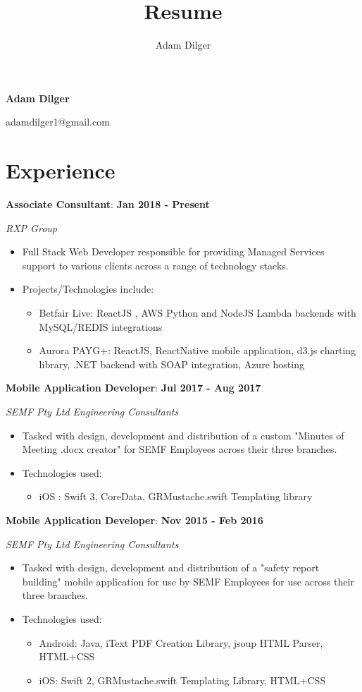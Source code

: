 \documentclass{article}
\author{Adam Dilger}
\title{Resume}
\makeatletter
\newcommand{\worktitle}[4]{
  \setlength{\parindent}{0pt}
  \small
  \textbf{#3}:
  \hfill
  \textbf{#1 - #2}

  \textit{#4}
}
\renewcommand{\maketitle}{
  \begin{center}
  \huge\textbf{Adam Dilger}
  \vspace{1mm}


  \normalsize
  adamdilger1@gmail.com
  \textbar
  \space
  0487349370
  \end{center}
}
\makeatother
\begin{document}
\maketitle

\section{Experience}

\worktitle
{Jan 2018}{Present}
{Associate Consultant}
{RXP Group}
\begin{itemize}
  \item Full Stack Web Developer responsible for providing Managed Services support to various clients across a range of technology stacks.
  \item Projects/Technologies include:
  \begin{itemize}
    \item Betfair Live: ReactJS , AWS Python and NodeJS Lambda backends with MySQL/REDIS integrations
    \item Aurora PAYG+: ReactJS, ReactNative mobile application, d3.js charting library, .NET backend with SOAP integration, Azure hosting
  \end{itemize}
\end{itemize}

\vspace{4mm}

\worktitle
{Jul 2017}{Aug 2017}
{Mobile Application Developer}
{SEMF Pty Ltd Engineering Consultants}
\begin{itemize}
  \item Tasked with design, development and distribution of a custom "Minutes of Meeting .docx creator" for SEMF Employees across their three branches.
  \item Technologies used:
  \begin{itemize}
    \item iOS : Swift 3, CoreData, GRMustache.swift Templating library
  \end{itemize}
\end{itemize}

\vspace{4mm}

\worktitle
{Nov 2015}{Feb 2016}
{Mobile Application Developer}
{SEMF Pty Ltd Engineering Consultants}
\begin{itemize}
  \item Tasked with design, development and distribution of a "safety report building" mobile application for use by SEMF Employees for use across their three branches.

  \item Technologies used:
  \begin{itemize}
    \item Android: Java, iText PDF Creation Library, jsoup HTML Parser, HTML+CSS
    \item iOS: Swift 2, GRMustache.swift Templating Library, HTML+CSS
  \end{itemize}
\end{itemize}
\end{document}
